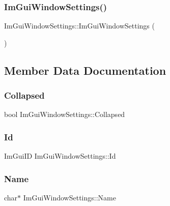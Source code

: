 \subsubsection{\texorpdfstring{Im\+Gui\+Window\+Settings()}{ImGuiWindowSettings()}}
{\footnotesize\ttfamily Im\+Gui\+Window\+Settings\+::\+Im\+Gui\+Window\+Settings (\begin{DoxyParamCaption}{ }\end{DoxyParamCaption})}



\subsection{Member Data Documentation}
\hypertarget{struct_im_gui_window_settings_a79308182bdab97cb87b3d6284f22c1d2}{}\label{struct_im_gui_window_settings_a79308182bdab97cb87b3d6284f22c1d2} 
\subsubsection{\texorpdfstring{Collapsed}{Collapsed}}
{\footnotesize\ttfamily bool Im\+Gui\+Window\+Settings\+::\+Collapsed}

\hypertarget{struct_im_gui_window_settings_a82d2bf00ccbd8ac796c20bb1daa9ab9a}{}\label{struct_im_gui_window_settings_a82d2bf00ccbd8ac796c20bb1daa9ab9a} 
\subsubsection{\texorpdfstring{Id}{Id}}
{\footnotesize\ttfamily Im\+Gui\+ID Im\+Gui\+Window\+Settings\+::\+Id}

\hypertarget{struct_im_gui_window_settings_a840259e14a45a600f84fcb940554e2d5}{}\label{struct_im_gui_window_settings_a840259e14a45a600f84fcb940554e2d5} 
\subsubsection{\texorpdfstring{Name}{Name}}
{\footnotesize\ttfamily char$\ast$ Im\+Gui\+Window\+Settings\+::\+Name}

